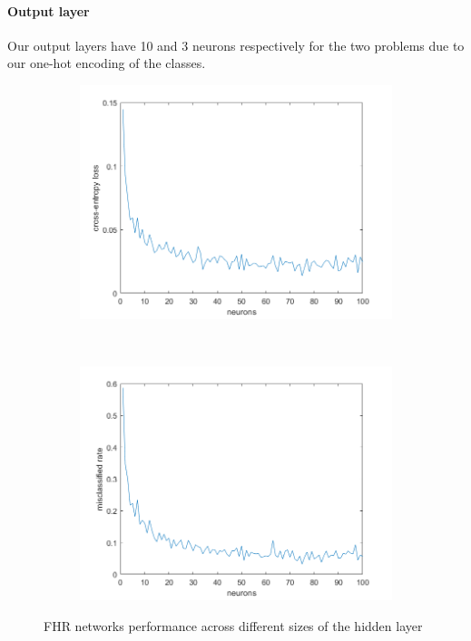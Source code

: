 \documentclass[11pt,a4paper]{article}
\begin{document}
\paragraph{Output layer}
Our output layers have 10 and 3 neurons respectively for the two problems due to our one-hot encoding of the classes.

\begin{figure}[htb]
  \centering
  \begin{subfigure}[b]{0.45\textwidth}
    \centering
    \includegraphics[width=\textwidth]{figures/delta_ce_class.png}
  \end{subfigure}
  ~
  \begin{subfigure}[b]{0.45\textwidth}
    \centering
    \includegraphics[width=\textwidth]{figures/delta_misclass_rate_class.png}
  \end{subfigure}
  \caption{FHR networks performance across different sizes of the hidden layer}
  \label{fig:FHR_performance}
\end{figure}
\end{document}
